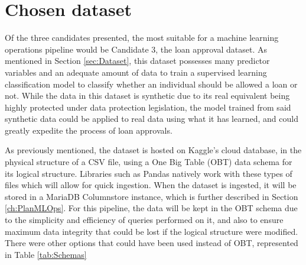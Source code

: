 \documentclass[12pt]{report}
\begin{document}
\section{Chosen dataset}
Of the three candidates presented, the most suitable for a machine learning operations pipeline would be Candidate 3, the loan approval dataset. As mentioned 
in Section \ref{sec:Dataset}, this dataset possesses many predictor variables and an adequate amount of data to train a supervised learning classification model 
to classify whether an individual should be allowed a loan or not. While the data in this dataset is synthetic due to its real equivalent being highly protected 
under data protection legislation, the model trained from said synthetic data could be applied to real data using what it has learned, and could greatly expedite 
the process of loan approvals.

As previously mentioned, the dataset is hosted on Kaggle's cloud database, in the physical structure of a  
CSV file, using a One Big Table (OBT) data schema for its logical structure.  
Libraries such as Pandas natively work with these types of files which will allow for quick ingestion. 
When the dataset is ingested, it will be stored in a MariaDB Columnstore instance, which is further 
described in Section \ref{ch:PlanMLOps}. For this pipeline, the data will be kept in the OBT schema
due to the simplicity and efficiency of queries performed on it, and also to ensure maximum data integrity
that could be lost if the logical structure were modified. There were other options that could have been used
instead of OBT, represented in Table \ref{tab:Schemas}
\end{document}
